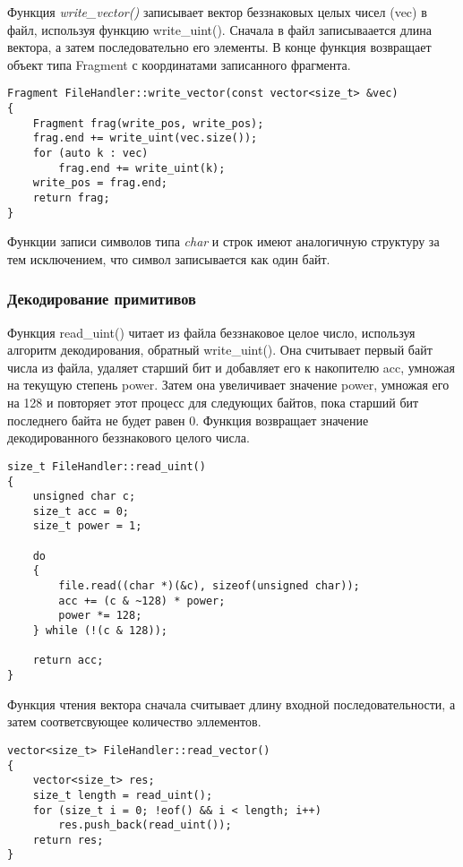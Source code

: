 \documentclass[14pt, russian]{scrartcl}
\begin{document}
Функция \textit{write\_vector()} записывает вектор беззнаковых целых чисел (vec) в файл, используя функцию write\_uint(). Сначала в файл записываается длина вектора, а затем последовательно его элементы. В конце функция возвращает объект типа Fragment с координатами записанного фрагмента.

\begin{verbatim}
Fragment FileHandler::write_vector(const vector<size_t> &vec)
{
	Fragment frag(write_pos, write_pos);
	frag.end += write_uint(vec.size());
	for (auto k : vec)
		frag.end += write_uint(k);
	write_pos = frag.end;
	return frag;
}
\end{verbatim}

Функции записи символов типа \textit{char} и строк имеют аналогичную структуру за тем исключением, что символ записывается как один байт.

\subsubsection{Декодирование примитивов}

Функция read\_uint() читает из файла беззнаковое целое число, используя алгоритм декодирования, обратный write\_uint(). Она считывает первый байт числа из файла, удаляет старший бит и добавляет его к накопителю acc, умножая на текущую степень power. Затем она увеличивает значение power, умножая его на 128 и повторяет этот процесс для следующих байтов, пока старший бит последнего байта не будет равен 0. Функция возвращает значение декодированного беззнакового целого числа.

\begin{verbatim}
size_t FileHandler::read_uint()
{
	unsigned char c;
	size_t acc = 0;
	size_t power = 1;

	do
	{
		file.read((char *)(&c), sizeof(unsigned char));
		acc += (c & ~128) * power;
		power *= 128;
	} while (!(c & 128));

	return acc;
}
\end{verbatim}

Функция чтения вектора сначала считывает длину входной последовательности, а затем соответсвующее количество эллементов.

\begin{verbatim}
vector<size_t> FileHandler::read_vector()
{
	vector<size_t> res;
	size_t length = read_uint();
	for (size_t i = 0; !eof() && i < length; i++)
		res.push_back(read_uint());
	return res;
}
\end{verbatim}
\end{document}
